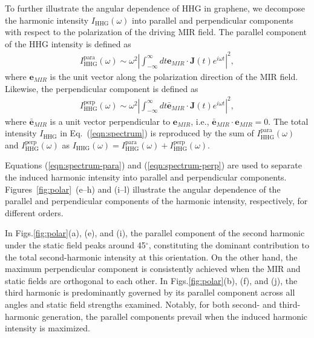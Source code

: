To further illustrate the angular dependence of HHG in graphene, we decompose the harmonic intensity $I_{\mathrm{HHG}}(\omega)$ into parallel and perpendicular components with respect to the polarization of the driving MIR field. The parallel component of the HHG intensity is defined as
\begin{align}
	I^{\textrm{para}}_{\mathrm{HHG}}(\omega)\sim \omega^2 \left | \int^{\infty}_{-\infty} dt \mathbf e_{MIR} \cdot \mathbf J(t) e^{i\omega t} \right |^2,
	\label{eqn:spectrum-para}
\end{align}
where $\mathbf e_{MIR}$ is the unit vector along the polarization direction of the MIR field. Likewise, the perpendicular component is defined as
\begin{align}
	I^{\textrm{perp}}_{\mathrm{HHG}}(\omega)\sim \omega^2 \left | \int^{\infty}_{-\infty} dt \bar{\mathbf e}_{MIR} \cdot \mathbf J(t) e^{i\omega t} \right |^2,
	\label{eqn:spectrum-perp}
\end{align}
where $\bar{\mathbf e}_{MIR}$ is a unit vector perpendicular to $\mathbf e_{MIR}$, i.e., $\bar{\mathbf e}_{MIR} \cdot\mathbf e_{MIR}=0$. The total intensity $I_{\textrm{HHG}}$ in Eq.~(\ref{eqn:spectrum}) is reproduced by the sum of $I^{\textrm{para}}_{\mathrm{HHG}}(\omega)$ and $I^{\textrm{perp}}_{\mathrm{HHG}}(\omega)$ as $I_{\mathrm{HHG}}(\omega)=I^{\textrm{para}}_{\mathrm{HHG}}(\omega)+I^{\textrm{perp}}_{\mathrm{HHG}}(\omega)$.

Equations (\ref{eqn:spectrum-para}) and (\ref{eqn:spectrum-perp}) are used to separate the induced harmonic intensity into parallel and perpendicular components. Figures~\ref{fig:polar}~(e--h) and (i--l) illustrate the angular dependence of the parallel and perpendicular components of the harmonic intensity, respectively, for different orders.

In Figs.\ref{fig:polar}(a), (e), and (i), the parallel component of the second harmonic under the static field peaks around 45$^{\circ}$, constituting the dominant contribution to the total second-harmonic intensity at this orientation. On the other hand, the maximum perpendicular component is consistently achieved when the MIR and static fields are orthogonal to each other. In Figs.\ref{fig:polar}(b), (f), and (j), the third harmonic is predominantly governed by its parallel component across all angles and static field strengths examined. Notably, for both second- and third-harmonic generation, the parallel components prevail when the induced harmonic intensity is maximized.


